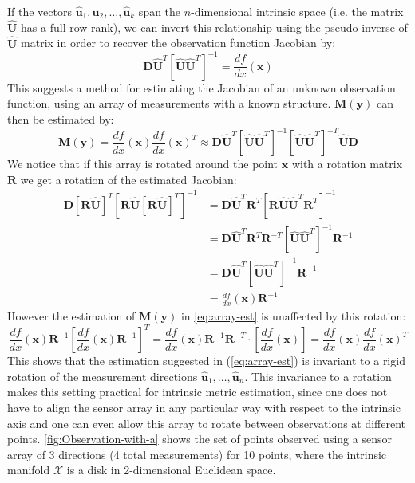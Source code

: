 If the vectors $\hat{\mathbf{u}}_{1},\hat{\mathbf{u}}_{2},\dots,\hat{\mathbf{u}}_{k}$ span the $n$-dimensional intrinsic space (i.e. the matrix $\hat{\mathbf{U}}$ has a full row rank), we can invert this relationship using the pseudo-inverse of $\hat{\mathbf{U}}$ matrix in order to recover the observation function Jacobian by:
\[
\mathbf{D}\hat{\mathbf{U}}^{T}\left[\hat{\mathbf{U}}\hat{\mathbf{U}}^{T}\right]^{-1}=\frac{df}{dx}\left(\mathbf{x}\right)
\]
This suggests a method for estimating the Jacobian of an unknown observation function, using an array of measurements with a known structure. $\mathbf{M}\left(\mathbf{y}\right)$ can then be estimated by:
\begin{equation}
\mathbf{M}\left(\mathbf{y}\right)=\frac{df}{dx}\left(\mathbf{x}\right)\frac{df}{dx}\left(\mathbf{x}\right)^{T}\approx\mathbf{D}\hat{\mathbf{U}}^{T}\left[\hat{\mathbf{U}}\hat{\mathbf{U}}^{T}\right]^{-1}\left[\hat{\mathbf{U}}\hat{\mathbf{U}}^{T}\right]^{-T}\hat{\mathbf{U}}\mathbf{D}\label{eq:array-est}
\end{equation}
We notice that if this array is rotated around the point $\mathbf{x}$ with a rotation matrix $\mathbf{R}$ we get a rotation of the estimated Jacobian:
\begin{align*}
	\mathbf{D}\left[\mathbf{R}\hat{\mathbf{U}}\right]^{T}\left[\mathbf{R}\hat{\mathbf{U}}\left[\mathbf{R}\hat{\mathbf{U}}\right]^{T}\right]^{-1} & =\mathbf{D}\hat{\mathbf{U}}^{T}\mathbf{R}^{T}\left[\mathbf{R}\hat{\mathbf{U}}\hat{\mathbf{U}}^{T}\mathbf{R}^{T}\right]^{-1}\\
	& =\mathbf{D}\hat{\mathbf{U}}^{T}\mathbf{R}^{T}\mathbf{R}^{-T}\left[\hat{\mathbf{U}}\hat{\mathbf{U}}^{T}\right]^{-1}\mathbf{R}^{-1}\\
	& =\mathbf{D}\hat{\mathbf{U}}^{T}\left[\hat{\mathbf{U}}\hat{\mathbf{U}}^{T}\right]^{-1}\mathbf{R}^{-1}\\
	& =\frac{df}{dx}\left(\mathbf{x}\right)\mathbf{R}^{-1}
\end{align*}
However the estimation of $\mathbf{M}\left(\mathbf{y}\right)$ in \cref{eq:array-est} is unaffected by this rotation:
\begin{equation}
\frac{df}{dx}\left(\mathbf{x}\right)\mathbf{R}^{-1}\left[\frac{df}{dx}\left(\mathbf{x}\right)\mathbf{R}^{-1}\right]^{T}=\frac{df}{dx}\left(\mathbf{x}\right)\mathbf{R}^{-1}\mathbf{R}^{-T}\cdot\left[\frac{df}{dx}\left(\mathbf{x}\right)\right]=\frac{df}{dx}\left(\mathbf{x}\right)\frac{df}{dx}\left(\mathbf{x}\right)^{T}
\end{equation}
This shows that the estimation suggested in (\cref{eq:array-est}) is invariant to a rigid rotation of the measurement directions $\hat{\mathbf{u}}_{1},\ldots,\hat{\mathbf{u}}_{n}$.
This invariance to a rotation makes this setting practical for intrinsic metric estimation, since one does not have to align the sensor array in any particular way with respect to the intrinsic axis and one can even allow this array to rotate between observations at different points. \cref{fig:Observation-with-a} shows the set of points observed using a sensor array of 3 directions (4 total measurements) for 10 points, where the intrinsic manifold $\mathcal{X}$ is a disk in 2-dimensional Euclidean space.

